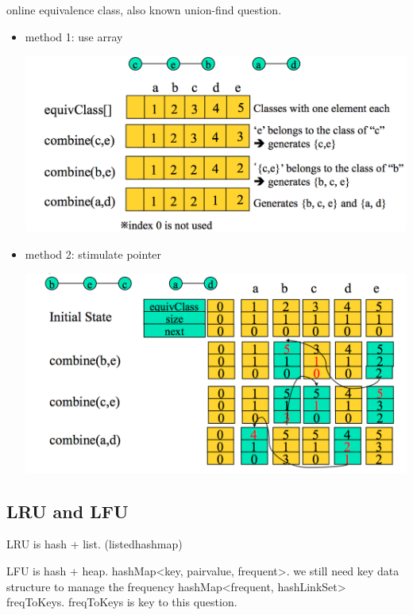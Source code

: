 \documentclass[a4paper,11pt,twoside]{book}
\begin{document}
	\par online equivalence class, also known union-find question.  
	\begin{itemize}
		\item method 1: use array  
\begin{center}
	\includegraphics[scale=0.55]{pics/online_1.png} 
\end{center}
		
		
		\item method 2: stimulate pointer
\begin{center}
	\includegraphics[scale=0.55]{pics/online_2.png}  
\end{center}
		
	\end{itemize}
	
	
\subsection{LRU and LFU}

	\par  LRU is hash + list. (listedhashmap)
	\par LFU is hash + heap. hashMap<key, pair{value, frequent}>. we still need key data structure to manage the frequency hashMap<frequent, hashLinkSet> freqToKeys.  freqToKeys is key to this question. 
	
\end{document}
